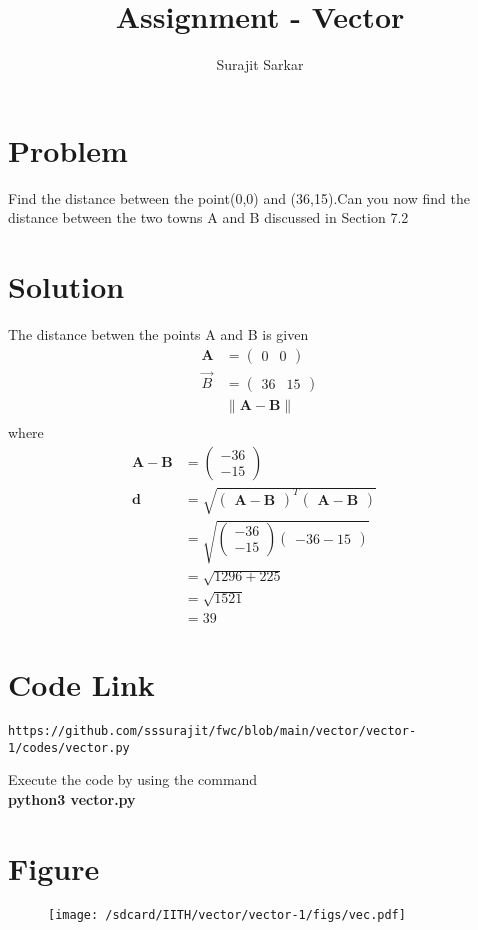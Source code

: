 \documentclass[journal,12pt,twocolumn]{IEEEtran}
\title{\mytitle}
\title{
Assignment - Vector
}
\author{Surajit Sarkar}
\newcommand{\myvec}[1]{\ensuremath{\begin{pmatrix}#1\end{pmatrix}}}
\providecommand{\norm}[1]{\lVert#1\rVert}
\let\vec\mathbf
\begin{document}
\maketitle
\tableofcontents
\bigskip
\section{\textbf{Problem}}
Find the distance between the point(0,0) and (36,15).Can you now find the distance between the two towns A and B discussed in Section 7.2
\section{\textbf{Solution}}
The distance betwen the points A and B is given
\begin{align}
\vec{A}&=\myvec{0 & 0}\\ 
\Vec{B}&=\myvec{36 & 15} \\
&\norm{\vec{A}-\vec{B}}\\
\end{align}
where
\begin{align}
\vec{A}-\vec{B}&=\myvec{-36\\-15} \\
\vec{d}&=\sqrt{\myvec{\vec{A}-\vec{B}}^T\myvec{\vec{A}-\vec{B}}}\\
&=\sqrt{\myvec{-36\\-15}{\myvec{-36-15}}}\\
&=\sqrt{1296+225} &\\
&=\sqrt{1521} &\\
&=39
\end{align}
\section{\textbf{Code Link}}
\begin{lstlisting}
https://github.com/sssurajit/fwc/blob/main/vector/vector-1/codes/vector.py
\end{lstlisting}
Execute the code by using the command\\
\textbf{python3 vector.py}\\
\section{\textbf{Figure}}
\begin{figure}[!ht]
    \centering
\texttt{[image: /sdcard/IITH/vector/vector-1/figs/vec.pdf]}
\caption{}
\label{fig:vec}
\end{figure}
\end{document}
